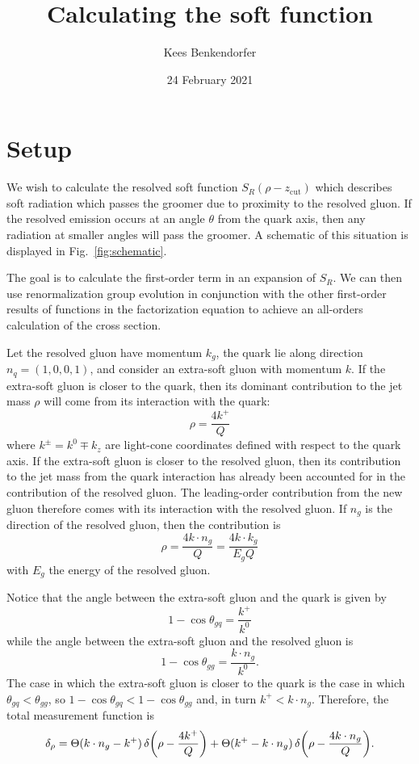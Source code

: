 \documentclass[11pt,twoside,reqno]{amsart}
\title{Calculating the soft function}
\author{Kees Benkendorfer}
\date{24 February 2021}
\theoremstyle{plain}
\theoremstyle{remark}
\theoremstyle{definition}
\theoremstyle{remark}
\theoremstyle{definition}
\theoremstyle{definition}
\newcommand{\zcut}{z_\mathrm{cut}}
\begin{document}
\maketitle

\tableofcontents

\section{Setup}
	We wish to calculate the resolved soft function $S_R(\rho - \zcut)$ which describes soft radiation which passes the groomer due to proximity to the resolved gluon. If the resolved emission occurs at an angle $\theta$ from the quark axis, then any radiation at smaller angles will pass the groomer. A schematic of this situation is displayed in Fig.~\ref{fig:schematic}.

	The goal is to calculate the first-order term in an expansion of $S_R$. We can then use renormalization group evolution in conjunction with the other first-order results of functions in the factorization equation to achieve an all-orders calculation of the cross section.

	Let the resolved gluon have momentum $k_g$, the quark lie along direction $n_q = (1, 0, 0, 1)$, and consider an extra-soft gluon with momentum $k$. If the extra-soft gluon is closer to the quark, then its dominant contribution to the jet mass $\rho$ will come from its interaction with the quark:
	\begin{equation}
		\rho = \frac{4 k^+}{Q}
	\end{equation}
	where $k^{\pm} = k^0 \mp k_z$ are light-cone coordinates defined with respect to the quark axis. If the extra-soft gluon is closer to the resolved gluon, then its contribution to the jet mass from the quark interaction has already been accounted for in the contribution of the resolved gluon. The leading-order contribution from the new gluon therefore comes with its interaction with the resolved gluon. If $n_g$ is the direction of the resolved gluon, then the contribution is
	\begin{equation}
		\rho = \frac{4 k \cdot n_g}{Q} = \frac{4 k \cdot k_g}{E_g Q}
	\end{equation}
	with $E_g$ the energy of the resolved gluon.

	Notice that the angle between the extra-soft gluon and the quark is given by
	\begin{equation}
		1 - \cos\theta_{gq} = \frac{k^+}{k^0}
	\end{equation}
	while the angle between the extra-soft gluon and the resolved gluon is
	\begin{equation}
		1 - \cos\theta_{gg} = \frac{k \cdot n_g}{k^0}.
	\end{equation}
	The case in which the extra-soft gluon is closer to the quark is the case in which $\theta_{gq} < \theta_{gg}$, so $1 - \cos\theta_{gq} < 1 - \cos\theta_{gg}$ and, in turn $k^+ < k \cdot n_g$. Therefore, the total measurement function is
	\begin{equation}
		\delta_\rho = \Theta(k\cdot n_g - k^+)\,\delta\qty(\rho - \frac{4k^+}{Q}) + \Theta(k^+ - k\cdot n_g)\,\delta\qty(\rho - \frac{4k\cdot n_g}{Q}).
	\end{equation}
\end{document}
